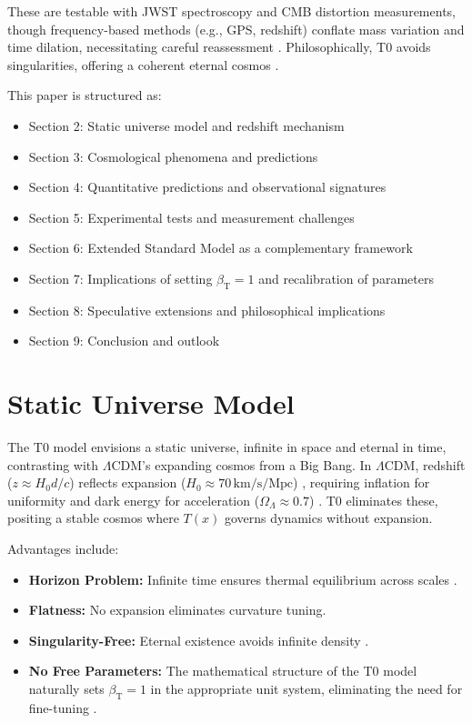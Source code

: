 \documentclass[12pt,a4paper]{article}
\newcommand{\Tfield}{T(x)}
\newcommand{\betaT}{\beta_{\text{T}}}
\newcommand{\LCDM}{\Lambda\text{CDM}}
\begin{document}
	These are testable with JWST spectroscopy and CMB distortion measurements, though frequency-based methods (e.g., GPS, redshift) conflate mass variation and time dilation, necessitating careful reassessment \cite{pascher_quantum_2025}. Philosophically, T0 avoids singularities, offering a coherent eternal cosmos \cite{pascher_perspective_2025}.
	
	This paper is structured as:
	\begin{itemize}
		\item Section 2: Static universe model and redshift mechanism
		\item Section 3: Cosmological phenomena and predictions
		\item Section 4: Quantitative predictions and observational signatures
		\item Section 5: Experimental tests and measurement challenges
		\item Section 6: Extended Standard Model as a complementary framework
		\item Section 7: Implications of setting \(\betaT = 1\) and recalibration of parameters
		\item Section 8: Speculative extensions and philosophical implications
		\item Section 9: Conclusion and outlook
	\end{itemize}
	
	\section{Static Universe Model}
	The T0 model envisions a static universe, infinite in space and eternal in time, contrasting with \(\LCDM\)'s expanding cosmos from a Big Bang. In \(\LCDM\), redshift (\(z \approx H_0 d / c\)) reflects expansion (\(H_0 \approx 70 \, \text{km/s/Mpc}\)) \cite{Planck2020}, requiring inflation for uniformity and dark energy for acceleration (\(\Omega_{\Lambda} \approx 0.7\)) \cite{Riess1998}. T0 eliminates these, positing a stable cosmos where \(\Tfield\) governs dynamics without expansion.
	
	Advantages include:
	\begin{itemize}
		\item \textbf{Horizon Problem:} Infinite time ensures thermal equilibrium across scales \cite{pascher_messdifferenzen_2025}.
		\item \textbf{Flatness:} No expansion eliminates curvature tuning.
		\item \textbf{Singularity-Free:} Eternal existence avoids infinite density \cite{pascher_perspective_2025}.
		\item \textbf{No Free Parameters:} The mathematical structure of the T0 model naturally sets \(\betaT = 1\) in the appropriate unit system, eliminating the need for fine-tuning \cite{pascher_alphabeta_2025}.
	\end{itemize}
	
\end{document}
